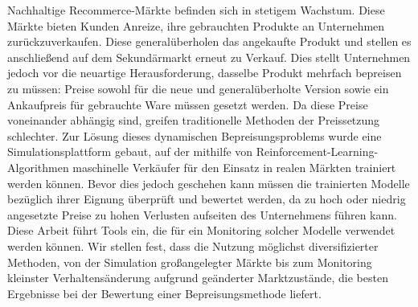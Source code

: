 Nachhaltige Recommerce-Märkte befinden sich in stetigem Wachstum. Diese Märkte bieten Kunden Anreize, ihre gebrauchten Produkte an Unternehmen zurückzuverkaufen. Diese generalüberholen das angekaufte Produkt und stellen es anschließend auf dem Sekundärmarkt erneut zu Verkauf. Dies stellt Unternehmen jedoch vor die neuartige Herausforderung, dasselbe Produkt mehrfach bepreisen zu müssen: Preise sowohl für die neue und generalüberholte Version sowie ein Ankaufpreis für gebrauchte Ware müssen gesetzt werden. Da diese Preise voneinander abhängig sind, greifen traditionelle Methoden der Preissetzung schlechter. Zur Lösung dieses dynamischen Bepreisungsproblems wurde eine Simulationsplattform gebaut, auf der mithilfe von Reinforcement-Learning-Algorithmen maschinelle Verkäufer für den Einsatz in realen Märkten trainiert werden können. Bevor dies jedoch geschehen kann müssen die trainierten Modelle bezüglich ihrer Eignung überprüft und bewertet werden, da zu hoch oder niedrig angesetzte Preise zu hohen Verlusten aufseiten des Unternehmens führen kann. Diese Arbeit führt Tools ein, die für ein Monitoring solcher Modelle verwendet werden können. Wir stellen fest, dass die Nutzung möglichst diversifizierter Methoden, von der Simulation großangelegter Märkte bis zum Monitoring kleinster Verhaltensänderung aufgrund geänderter Marktzustände, die besten Ergebnisse bei der Bewertung einer Bepreisungsmethode liefert.